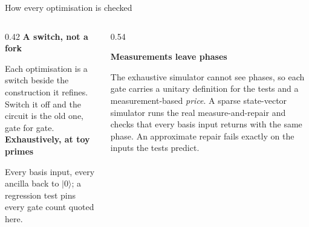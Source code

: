 \documentclass[aspectratio=169,11pt]{beamer}
\newcommand{\blocktitle}[1]{{\bfseries #1}\par\vskip1mm}
\begin{document}
\begin{frame}{How every optimisation is checked}
  \begin{columns}[T]
    \begin{column}{0.42\textwidth}
      \blocktitle{A switch, not a fork}
      Each optimisation is a switch beside the construction it refines. Switch it off and the circuit is the old one, gate for gate.
      \vskip3mm
      \blocktitle{Exhaustively, at toy primes}
      Every basis input, every ancilla back to $|0\rangle$; a regression test pins every gate count quoted here.
    \end{column}
    \begin{column}{0.54\textwidth}
      \begin{greyblock}
        \blocktitle{Measurements leave phases}
        The exhaustive simulator cannot see phases, so each gate carries a unitary definition for the tests and a measurement-based \emph{price}. A sparse state-vector simulator runs the real measure-and-repair and checks that every basis input returns with the same phase. An approximate repair fails exactly on the inputs the tests predict.
      \end{greyblock}
    \end{column}
  \end{columns}
\end{frame}
\end{document}
